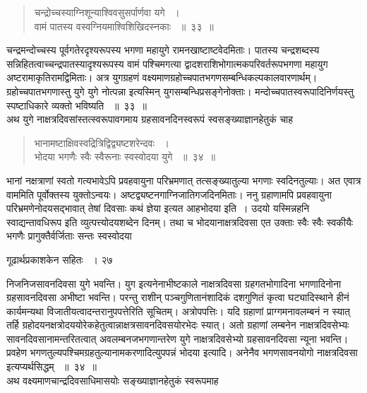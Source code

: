 \documentclass[11pt, openany]{book}
\begin{document}
  
  \begin{quote}
 {\ssi चन्द्रोच्चस्याग्निशून्याश्विवसुसर्पार्णवा यगे ~।\\
वामं पातस्य वस्वग्नियमाश्विशिखिदस्नकाः ~॥~३३~॥}
\end{quote}
\begin{sloppypar}
 चन्द्रमन्दोच्चस्य पूर्वगतेरदृश्यरूपस्य भगणा महायुगे रामनखाष्टाष्टवेदमिताः। पातस्य चन्द्रशब्दस्य सन्निहितत्वाच्चन्द्रपातस्यादृश्यरूपस्य वामं पश्चिमगत्या द्वादशराशिभोगात्मकपरिवर्तरूपभगणा महायुग अष्टरामाकृतिरामद्विमिताः। अत्र युगग्रहणं वक्ष्यमाणग्रहोच्चपातभगणसम्बन्धिकल्पकालवारणार्थम्। ग्रहोच्चपातभगणास्तु युगे युगे नोत्पन्ना इत्यस्मिन् युगसम्बन्धिप्रसङ्गेनोक्ताः। मन्दोच्चपातस्वरूपादिनिर्णयस्तु स्पष्टाधिकारे व्यक्तो भविष्यति ~॥~३३~॥\\  
 \noindent अथ युगे नाक्षत्रदिवसांस्तत्स्वरूपावगमाय ग्रहसावनदिनस्वरूपं स्वसङ्ख्याज्ञानहेतुकं चाह\textendash
\end{sloppypar}
\begin{quote}
 
 {\ssi भानामष्टाक्षिवस्वद्रित्रिद्विद्व्यष्टशरेन्दवः ~।\\
भोदया भगणैः स्वैः स्वैरूनाः स्वस्वोदया युगे ~॥~३४~॥}
\end{quote}
\begin{sloppypar}
भानां नक्षत्राणां स्वतो गत्यभावेऽपि प्रवहवायुना परिभ्रमणात् तत्सङ्ख्यातुल्या भगणाः स्वदिनतुल्याः। अत एवात्र वाममिति पूर्वोक्तस्य युक्तोऽन्वयः। अष्टद्व्यष्टनगाग्निजातिगजदिनमिताः। ननु ग्रहाणामपि प्रवहवायुना परिभ्रमणेनोदयसद्भावात् तेषां दिवसाः कथं ज्ञेया इत्यत आह\textendash भोदया इति~। उदयो यस्मिन्नहनि स्वाद्यन्तावधिरूप इति व्युत्पत्त्योदयशब्देन दिनम्। तथा च भोदयानाक्षत्रदिवसा एत उक्ताः स्वैः स्वैः स्वकीयैः भगणैः प्रागुक्तैर्वर्जिताः सन्तः स्वस्वोदया
\end{sloppypar}

\newpage

\hspace{3cm} गूढार्थप्रकाशकेन सहितः ~। \hfill २७
\vspace{1cm}
 
\noindent निजनिजसावनदिवसा युगे भवन्ति। युग इत्यनेनाभीष्टकाले नाक्षत्रदिवसा ग्रहगतभोगादिना भगणादिनोना ग्रहसावनदिवसा अभीष्टा भवन्ति। परन्तु राशीन् पञ्चगुणितानंशादिकं दशगुणितं कृत्वा घट्यादिस्थाने हीनं कार्यमन्यथा विजातीयत्वादन्तरानुपपत्तेरिति सूचितम्। अत्रोपपत्तिः। यदि ग्रहाणां प्राग्गमनावलम्बनं न स्यात् तर्हि ग्रहोदयनक्षत्रोदययोरेकहेतुत्वान्नाक्षत्रसावनदिवसयोरभेदः स्यात्। अतो ग्रहाणां लम्बनेन नाक्षत्रदिवसेभ्यः सावनदिवसानामन्तरितत्वात् अवलम्बनजभगणान्तरेण युगे नाक्षत्रदिवसेभ्यो ग्रहसावनदिवसा न्यूना भवन्ति। प्रवहेण भगणतुल्यपश्चिमग्रहतुल्यानामकरणादित्युपपन्नं भोदया इत्यादि। अनेनैव भगणसावनयोगो नाक्षत्रदिवसा इत्यप्यर्थसिद्धम् ~॥~३४~॥\\ 
\noindent अथ वक्ष्यमाणचान्द्रदिवसाधिमासयोः सङ्ख्याज्ञानहेतुकं स्वरूपमाह\textendash
\end{document}
